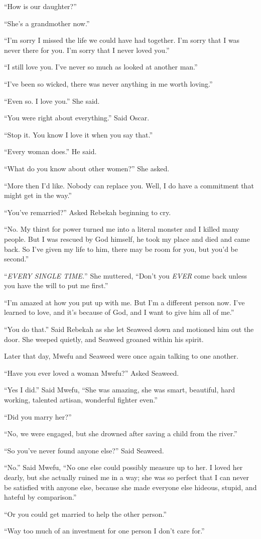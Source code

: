 ``How is our daughter?''

``She's a grandmother now.''

``I'm sorry I missed the life we could have had together. I'm sorry that I was never there for you. I'm sorry that I never loved you.''

``I still love you. I've never so much as looked at another man.''

``I've been so wicked, there was never anything in me worth loving.''

``Even so. I love you.'' She said.

``You were right about everything.'' Said Oscar.

``Stop it. You know I love it when you say that.''

``Every woman does.'' He said.

``What do you know about other women?'' She asked.

``More then I'd like. Nobody can replace you. Well, I do have a commitment that might get in the way.''

``You've remarried?'' Asked Rebekah beginning to cry.

``No. My thirst for power turned me into a literal monster and I killed many people. But I was rescued by God himself, he took my place and died and came back. So I've given my life to him, there may be room for you, but you'd be second.''

``\emph{EVERY SINGLE TIME.}'' She muttered, ``Don't you \emph{EVER} come back unless you have the will to put me first.''

``I'm amazed at how you put up with me. But I'm a different person now. I've learned to love, and it's because of God, and I want to give him all of me.''

``You do that.'' Said Rebekah as she let Seaweed down and motioned him out the door. She weeped quietly, and Seaweed groaned within his spirit.

\tbreak

Later that day, Mwefu and Seaweed were once again talking to one another.

``Have you ever loved a woman Mwefu?'' Asked Seaweed.

``Yes I did.'' Said Mwefu, ``She was amazing, she was smart, beautiful, hard working, talented artisan, wonderful fighter even.''

``Did you marry her?''

``No, we were engaged, but she drowned after saving a child from the river.''

``So you've never found anyone else?'' Said Seaweed.

``No.'' Said Mwefu, ``No one else could possibly measure up to her. I loved her dearly, but she actually ruined me in a way; she was so perfect that I can never be satisfied with anyone else, because she made everyone else hideous, stupid, and hateful by comparison.''

``Or you could get married to help the other person.''

``Way too much of an investment for one person I don't care for.''
